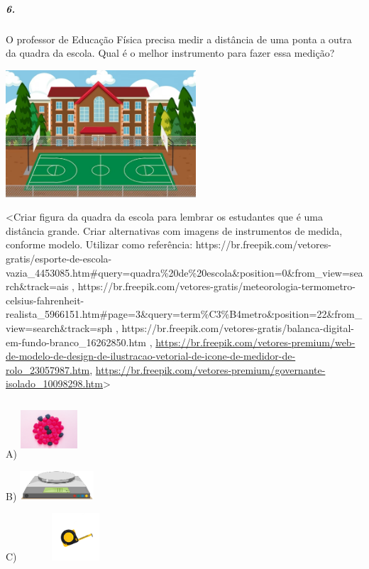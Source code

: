 \subparagraph{6. }\label{section-120}

O professor de Educação Física precisa medir a distância de uma ponta a
outra da quadra da escola. Qual é o melhor instrumento para fazer essa
medição?

\includegraphics[width=2.79514in,height=1.86343in]{media/image131.jpeg}

\textless{}Criar figura da quadra da escola para lembrar os estudantes
que é uma distância grande. Criar alternativas com imagens de
instrumentos de medida, conforme modelo. Utilizar como referência:
https://br.freepik.com/vetores-gratis/esporte-de-escola-vazia\_4453085.htm\#query=quadra\%20de\%20escola\&position=0\&from\_view=search\&track=ais
,
https://br.freepik.com/vetores-gratis/meteorologia-termometro-celsius-fahrenheit-realista\_5966151.htm\#page=3\&query=term\%C3\%B4metro\&position=22\&from\_view=search\&track=sph
,
https://br.freepik.com/vetores-gratis/balanca-digital-em-fundo-branco\_16262850.htm
,
\url{https://br.freepik.com/vetores-premium/web-de-modelo-de-design-de-ilustracao-vetorial-de-icone-de-medidor-de-rolo_23057987.htm},
\url{https://br.freepik.com/vetores-premium/governante-isolado_10098298.htm}\textgreater{}

A)
\includegraphics[width=0.83333in,height=0.83333in]{media/image132.png}

B)
\includegraphics[width=1.08507in,height=0.42273in]{media/image133.png}

C)
\includegraphics[width=1.63194in,height=0.70267in]{media/image134.png}

